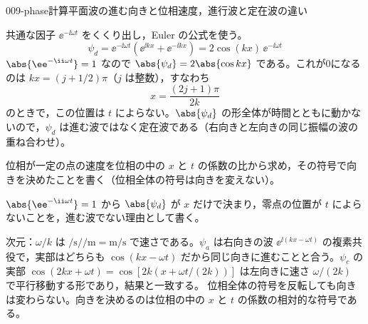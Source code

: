 \documentclass[uplatex,dvipdfmx,a4paper,11pt]{jsarticle}
\begin{document}
\begin{mondai}{009-phase}{計算}{平面波の進む向きと位相速度，進行波と定在波の違い}
\begin{tadashii}
 共通な因子 $\ee^{-\ii\omega t}$ をくくり出し，Euler の公式を使う。
\[ \psi_{d}=\ee^{-\ii\omega t}\left(\ee^{\ii kx}+\ee^{-\ii kx}\right)=2\cos(kx)\,\ee^{-\ii\omega t} \]
$\abs{\ee^{-\ii\omega t}}=1$ なので $\abs{\psi_{d}}=2\abs{\cos kx}$ である。これが0になるのは $kx=(j+1/2)\pi$（$j$ は整数），すなわち
\[ x=\frac{(2j+1)\pi}{2k} \]
のときで，この位置は $t$ によらない。$\abs{\psi_{d}}$ の形全体が時間とともに動かないので，$\psi_{d}$ は進む波ではなく定在波である（右向きと左向きの同じ振幅の波の重ね合わせ）。
\begin{ronten}
  \item {} 位相が一定の点の速度を位相の中の $x$ と $t$ の係数の比から求め，その符号で向きを決めたことを書く（位相全体の符号は向きを変えない）。
  \item {} $\abs{\ee^{-\ii\omega t}}=1$ から $\abs{\psi_{d}}$ が $x$ だけで決まり，零点の位置が $t$ によらないことを，進む波でない理由として書く。
\end{ronten}
\kenzan 次元：$\omega/k$ は $\unit{\per\second}/\unit{\per\metre}=\unit{\metre\per\second}$ で速さである。$\psi_{a}$ は右向きの波 $\ee^{\ii(kx-\omega t)}$ の複素共役で，実部はどちらも $\cos(kx-\omega t)$ だから同じ向きに進むことと合う。$\psi_{c}$ の実部 $\cos(2kx+\omega t)=\cos[2k(x+\omega t/(2k))]$ は左向きに速さ $\omega/(2k)$ で平行移動する形であり，結果と一致する。
\tsumazuki 位相全体の符号を反転しても向きは変わらない。向きを決めるのは位相の中の $x$ と $t$ の係数の相対的な符号である。
\end{tadashii}
\end{mondai}
\end{document}
